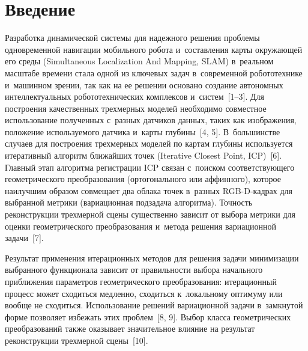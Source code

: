 
  
\vspace*{-3pt}



\thispagestyle{headings}

\begin{multicols}{2}

\label{st\stat}
  
\section{Введение}

  Разработка динамической системы для надежного решения проблемы 
одновременной навигации мобильного робота и~составления карты 
окру\-жа\-ющей его среды (Simultaneous Localization And Mapping, SLAM) 
в~реальном масштабе времени стала одной из ключевых задач в~современной 
робототехнике и~машинном зрении, так как на ее решении основано создание 
автономных интеллектуальных робототехнических комплексов и~сис\-тем~[1--3]. 
Для построения качественных трехмерных моделей необходимо совместное 
использование полученных с~разных датчиков данных, таких как изображения, 
положение используемого датчика и~карты глубины~[4, 5]. В~большинстве 
случаев для построения трехмерных моделей по картам глубины используется 
итеративный алгоритм ближайших точек (Iterative Closest Point, ICP)~[6]. 
Главный этап алгоритма регистрации ICP связан с~поиском соответствующего 
геометрического преобразования (ортогонального или аффинного), которое 
наилучшим образом совмещает два облака точек в~разных RGB-D-кад\-рах для 
выбранной метрики (вариационная подзадача алгоритма). Точ\-ность 
реконструкции трехмерной сцены существенно зависит от выбора метрики для 
оценки гео\-мет\-ри\-че\-ско\-го преобразования и~метода решения вариационной 
задачи~[7]. 

Результат применения итерационных методов для решения задачи 
минимизации выбранного функционала зависит от правильности выбора 
начального приближения па\-ра\-мет\-ров гео\-мет\-ри\-че\-ско\-го преобразования: 
итерационный процесс может сходиться медленно, сходиться к~локальному 
оптимуму или вообще не сходиться. Использование решений вариационной 
задачи в~замк\-ну\-той форме позволяет избежать этих проблем~[8, 9]. Выбор 
класса гео\-мет\-ри\-че\-ских преобразований так\-же оказывает значительное влияние 
на результат реконструкции трехмерной сцены~[10].


\end{multicols}
